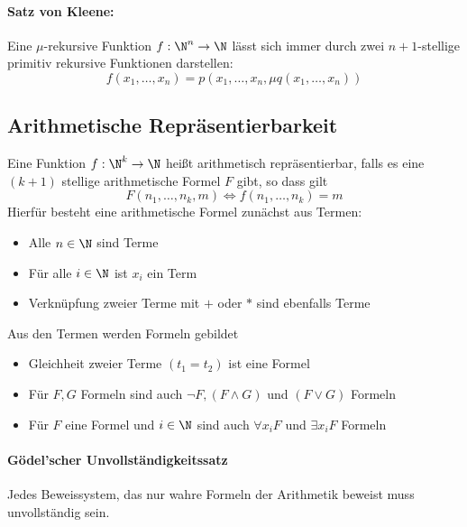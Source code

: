 \paragraph{Satz von Kleene:} Eine $\mu$-rekursive Funktion $f:\N^n\rightarrow\N$ lässt sich immer durch zwei $n+1$-stellige primitiv rekursive Funktionen darstellen:
\begin{equation*}
	f(x_1,\ldots,x_n)=p(x_1,\ldots,x_n,\mu q(x_1,\ldots,x_n))
\end{equation*}

\subsection{Arithmetische Repräsentierbarkeit}\label{sec:arithm}
Eine Funktion $f:\N^k\rightarrow \N$ heißt arithmetisch repräsentierbar, falls es eine $(k+1)$ stellige arithmetische Formel $F$ gibt, so dass gilt
\begin{equation*}
	F(n_1,\ldots,n_k,m)\Leftrightarrow f(n_1,\ldots,n_k)=m
\end{equation*}
Hierfür besteht eine arithmetische Formel zunächst aus Termen:
\begin{itemize}
	\item Alle $n\in\N$ sind Terme
	\item Für alle $i\in\N$ ist $x_i$ ein Term
	\item Verknüpfung zweier Terme mit $+$ oder $\ast$ sind ebenfalls Terme
\end{itemize}
Aus den Termen werden Formeln gebildet
\begin{itemize}
	\item Gleichheit zweier Terme $(t_1=t_2)$ ist eine Formel
	\item Für $F,G$ Formeln sind auch $\neg F, (F\wedge G)$ und $(F\vee G)$ Formeln
	\item Für $F$ eine Formel und $i\in\N$ sind auch $\forall x_i F$ und $\exists x_i F$ Formeln
\end{itemize}

\paragraph{Gödel'scher Unvollständigkeitssatz}
Jedes Beweissystem, das nur wahre Formeln der Arithmetik beweist muss unvollständig sein.

